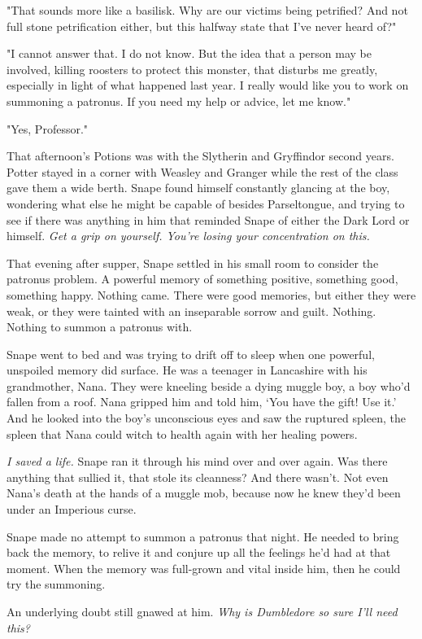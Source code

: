 \documentclass[a4paper,11pt]{article}
\begin{document}
"That sounds more like a basilisk. Why are our victims being petrified? And not full stone petrification either, but this halfway state that I've never heard of?"

"I cannot answer that. I do not know. But the idea that a person may be involved, killing roosters to protect this monster, that disturbs me greatly, especially in light of what happened last year. I really would like you to work on summoning a patronus. If you need my help or advice, let me know."

"Yes, Professor."

That afternoon's Potions was with the Slytherin and Gryffindor second years. Potter stayed in a corner with Weasley and Granger while the rest of the class gave them a wide berth. Snape found himself constantly glancing at the boy, wondering what else he might be capable of besides Parseltongue, and trying to see if there was anything in him that reminded Snape of either the Dark Lord or himself. \emph{Get a grip on yourself. You're losing your concentration on this.}

That evening after supper, Snape settled in his small room to consider the patronus problem. A powerful memory of something positive, something good, something happy. Nothing came. There were good memories, but either they were weak, or they were tainted with an inseparable sorrow and guilt. Nothing. Nothing to summon a patronus with.

Snape went to bed and was trying to drift off to sleep when one powerful, unspoiled memory did surface. He was a teenager in Lancashire with his grandmother, Nana. They were kneeling beside a dying muggle boy, a boy who'd fallen from a roof. Nana gripped him and told him, `You have the gift! Use it.' And he looked into the boy's unconscious eyes and saw the ruptured spleen, the spleen that Nana could witch to health again with her healing powers.

\emph{I saved a life.} Snape ran it through his mind over and over again. Was there anything that sullied it, that stole its cleanness? And there wasn't. Not even Nana's death at the hands of a muggle mob, because now he knew they'd been under an Imperious curse.

Snape made no attempt to summon a patronus that night. He needed to bring back the memory, to relive it and conjure up all the feelings he'd had at that moment. When the memory was full-grown and vital inside him, then he could try the summoning.

An underlying doubt still gnawed at him. \emph{Why is Dumbledore so sure I'll need this?}
\end{document}

